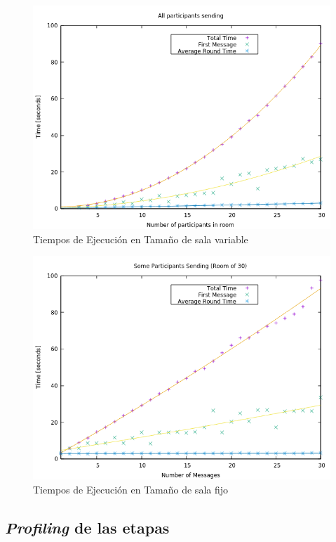 \begin{figure}[H]
  \centering
    \includegraphics[scale=0.7]{logs/logs_all/times.png}
  \caption{Tiempos de Ejecución en Tamaño de sala variable}
  \label{fig:times-variable}
\end{figure}

\begin{figure}[H]
  \centering
    \includegraphics[scale=0.7]{logs/logs_partial_30/times.png}
  \caption{Tiempos de Ejecución en Tamaño de sala fijo}
  \label{fig:times-fixed}
\end{figure}

\subsection{\emph{Profiling} de las etapas}

